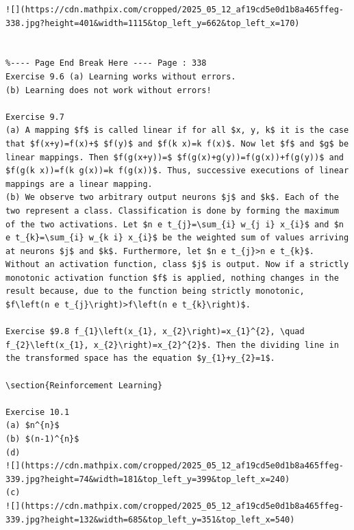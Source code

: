\documentclass[10pt]{book}
\begin{document}
\begin{verbatim}
![](https://cdn.mathpix.com/cropped/2025_05_12_af19cd5e0d1b8a465ffeg-338.jpg?height=401&width=1115&top_left_y=662&top_left_x=170)


%---- Page End Break Here ---- Page : 338
Exercise 9.6 (a) Learning works without errors.
(b) Learning does not work without errors!

Exercise 9.7
(a) A mapping $f$ is called linear if for all $x, y, k$ it is the case that $f(x+y)=f(x)+$ $f(y)$ and $f(k x)=k f(x)$. Now let $f$ and $g$ be linear mappings. Then $f(g(x+y))=$ $f(g(x)+g(y))=f(g(x))+f(g(y))$ and $f(g(k x))=f(k g(x))=k f(g(x))$. Thus, successive executions of linear mappings are a linear mapping.
(b) We observe two arbitrary output neurons $j$ and $k$. Each of the two represent a class. Classification is done by forming the maximum of the two activations. Let $n e t_{j}=\sum_{i} w_{j i} x_{i}$ and $n e t_{k}=\sum_{i} w_{k i} x_{i}$ be the weighted sum of values arriving at neurons $j$ and $k$. Furthermore, let $n e t_{j}>n e t_{k}$. Without an activation function, class $j$ is output. Now if a strictly monotonic activation function $f$ is applied, nothing changes in the result because, due to the function being strictly monotonic, $f\left(n e t_{j}\right)>f\left(n e t_{k}\right)$.

Exercise $9.8 f_{1}\left(x_{1}, x_{2}\right)=x_{1}^{2}, \quad f_{2}\left(x_{1}, x_{2}\right)=x_{2}^{2}$. Then the dividing line in the transformed space has the equation $y_{1}+y_{2}=1$.

\section{Reinforcement Learning}

Exercise 10.1
(a) $n^{n}$
(b) $(n-1)^{n}$
(d)
![](https://cdn.mathpix.com/cropped/2025_05_12_af19cd5e0d1b8a465ffeg-339.jpg?height=74&width=181&top_left_y=399&top_left_x=240)
(c)
![](https://cdn.mathpix.com/cropped/2025_05_12_af19cd5e0d1b8a465ffeg-339.jpg?height=132&width=685&top_left_y=351&top_left_x=540)


\end{verbatim}
\end{document}
